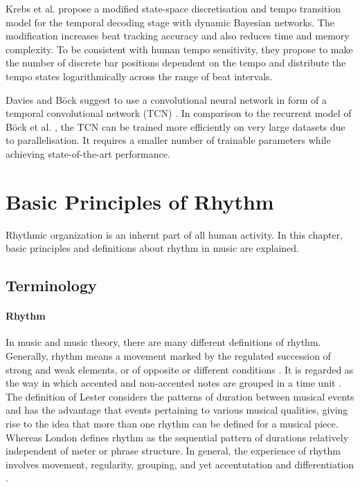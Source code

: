 \documentclass{scrartcl}
\begin{document}
Krebs et al. \cite{Krebs2015} propose a modified state-space discretisation and tempo transition model for the temporal decoding stage with dynamic Bayesian networks. The modification increases beat tracking accuracy and also reduces time and memory complexity. To be consistent with human tempo sensitivity, they propose to make the number of discrete bar positions dependent on the tempo and distribute the tempo states logarithmically across the range of beat intervals. 

Davies and Böck \cite{Davies2019} suggest to use a convolutional neural network in form of a temporal convolutional network (TCN) \cite{Bai2018}. In comparison to the recurrent model of Böck et al. \cite{Boeck2014}, the TCN can be trained more efficiently on very large datasets due to parallelisation. It requires a smaller number of trainable parameters while achieving state-of-the-art performance. 



\newpage
\section{Basic Principles of Rhythm}
\label{sec:perception}

Rhythmic organization is an inhernt part of all human activity. In this chapter, basic principles and definitions about rhythm in music are explained.  


\subsection{Terminology}

\paragraph{Rhythm} 
In music and music theory, there are many different definitions of rhythm. Generally, rhythm means a movement marked by the regulated succession of strong and weak elements, or of opposite or different conditions \cite{Dictionary1971}. It is regarded as the way in which accented and non-accented notes are grouped in a time unit \cite{Cooper1966}. The definition of Lester \cite{Lester1986} considers the patterns of duration between musical events and has the advantage that events pertaining to various musical qualities, giving rise to the idea that more than one rhythm can be defined for a musical piece. Whereas London \cite{London2001} defines rhythm as the sequential pattern of durations relatively independent of meter or phrase structure. In general, the experience of rhythm involves movement, regularity, grouping, and yet accentutation and differentiation \cite{Handel1989}.
\end{document}
